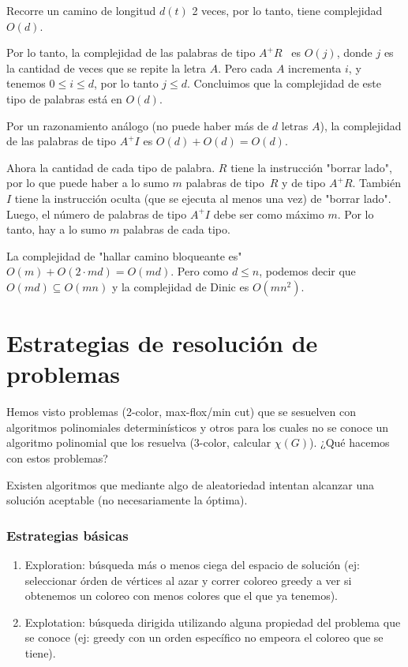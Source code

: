 \documentclass[10pt,a4paper]{article}
\begin{document}
Recorre un camino de longitud $d(t)$ 2 veces, por lo tanto, tiene complejidad $O(d)$.

Por lo tanto, la complejidad de las palabras de tipo $A^+R$  es $O(j)$, donde $j$ es la cantidad de veces que se repite la letra $A$. Pero cada $A$ incrementa $i$, y tenemos $0 \leq i \leq d$, por lo tanto $j\leq d$. Concluimos que la complejidad de este tipo de palabras está en $O(d)$.

Por un razonamiento análogo (no puede haber más de $d$ letras $A$), la complejidad de las palabras de tipo $A^+I$ es $O(d) + O(d) = O(d)$.

Ahora la cantidad de cada tipo de palabra. $R$ tiene la instrucción "borrar lado", por lo que puede haber a lo sumo $m$ palabras de tipo $R$ y de tipo $A^+R$. También $I$ tiene la instrucción oculta (que se ejecuta al menos una vez) de "borrar lado". Luego, el número de palabras de tipo $A^+I$ debe ser como máximo $m$. Por lo tanto, hay a lo sumo $m$ palabras de cada tipo.

La complejidad de "hallar camino bloqueante es" $O(m) + O(2\cdot md) = O(md)$. Pero como $d\leq n$, podemos decir que $O(md) \subseteq O (mn)$ y la complejidad de Dinic es $O(mn^2)$.


\section*{Estrategias de resolución de problemas}

Hemos visto problemas (2-color, max-flox/min cut) que se sesuelven con algoritmos polinomiales determinísticos y otros para los cuales no se conoce un algoritmo polinomial que los resuelva (3-color, calcular $\chi(G)$). ¿Qué hacemos con estos problemas?

Existen algoritmos que mediante algo de aleatoriedad intentan alcanzar una solución aceptable (no necesariamente la óptima).

\subsubsection*{Estrategias básicas}

\begin{enumerate}

	\item Exploration: búsqueda más o menos ciega del espacio de solución (ej: seleccionar órden de vértices al azar y correr coloreo greedy a ver si obtenemos un coloreo con menos colores que el que ya tenemos).
	\item Explotation: búsqueda dirigida utilizando alguna propiedad del problema que se conoce (ej: greedy con un orden específico no empeora el coloreo que se tiene).
\end{enumerate}
\end{document}
